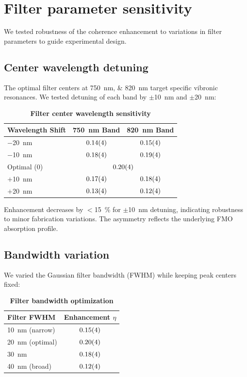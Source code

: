 \documentclass[11pt,a4paper]{article}
\begin{document}
\section{Filter parameter sensitivity}
\label{sec:S9}

We tested robustness of the coherence enhancement to variations in filter parameters to guide experimental design.

\subsection{Center wavelength detuning}

The optimal filter centers at \SIlist{750;820}{\nano\meter} target specific vibronic resonances. We tested detuning of each band by $\pm$\SI{10}{\nano\meter} and $\pm$\SI{20}{\nano\meter}:

\begin{table}[htb]
\centering
\caption{\textbf{Filter center wavelength sensitivity}}
\label{tab:SI_wavelength}
\begin{tabular}{lcc}
\toprule
\textbf{Wavelength Shift} & \textbf{750~nm Band} & \textbf{820~nm Band} \\
\midrule
$-$\SI{20}{\nano\meter} & $\num{0.14 \pm 0.04}$ & $\num{0.15 \pm 0.04}$ \\
$-$\SI{10}{\nano\meter} & $\num{0.18 \pm 0.04}$ & $\num{0.19 \pm 0.04}$ \\
Optimal (0) & \multicolumn{2}{c}{$\num{0.20 \pm 0.04}$} \\
$+$\SI{10}{\nano\meter} & $\num{0.17 \pm 0.04}$ & $\num{0.18 \pm 0.04}$ \\
$+$\SI{20}{\nano\meter} & $\num{0.13 \pm 0.04}$ & $\num{0.12 \pm 0.04}$ \\
\bottomrule
\end{tabular}
\end{table}

Enhancement decreases by $<$\SI{15}{\percent} for $\pm$\SI{10}{\nano\meter} detuning, indicating robustness to minor fabrication variations. The asymmetry reflects the underlying FMO absorption profile.

\subsection{Bandwidth variation}

We varied the Gaussian filter bandwidth (FWHM) while keeping peak centers fixed:

\begin{table}[htb]
\centering
\caption{\textbf{Filter bandwidth optimization}}
\label{tab:SI_bandwidth}
\begin{tabular}{lc}
\toprule
\textbf{Filter FWHM} & \textbf{Enhancement $\eta$} \\
\midrule
\SI{10}{\nano\meter} (narrow) & $\num{0.15 \pm 0.04}$ \\
\SI{20}{\nano\meter} (optimal) & $\num{0.20 \pm 0.04}$ \\
\SI{30}{\nano\meter} & $\num{0.18 \pm 0.04}$ \\
\SI{40}{\nano\meter} (broad) & $\num{0.12 \pm 0.04}$ \\
\bottomrule
\end{tabular}
\end{table}
\end{document}
